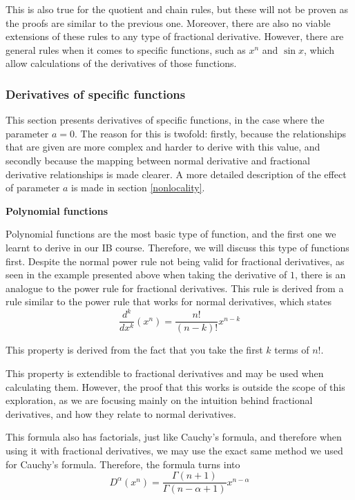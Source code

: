 \documentclass{article}
\begin{document}
This is also true for the quotient and chain rules, but these will not be
proven as the proofs are similar to the previous one. Moreover, there are also
no viable extensions of these rules to any type of fractional
derivative. However, there are general rules when it comes to specific
functions, such as $x^n$ and $\sin x$, which allow calculations of the
derivatives of those functions.

\subsubsection{Derivatives of specific functions} \label{der_examples}

This section presents derivatives of specific functions, in the case where the
parameter $a=0$. The reason for this is twofold: firstly, because the
relationships that are given are more complex and harder to derive with this
value, and secondly because the mapping between normal derivative and
fractional derivative relationships is made clearer. A more detailed
description of the effect of parameter $a$ is made in section
\ref{nonlocality}.

\textbf{Polynomial functions}

Polynomial functions are the most basic type of function, and the first one we
learnt to derive in our IB course. Therefore, we will discuss this type of
functions first. Despite the normal power rule not being valid for fractional
derivatives, as seen in the example presented above when taking the derivative
of $1$, there is an analogue to the power rule for fractional derivatives. This
rule is derived from a rule similar to the power rule that works for normal
derivatives, which states
$$
\frac{d^k}{dx^k} \left(x^n\right) = \frac{n!}{\left(n-k\right)!} x^{n-k}
$$
\parencite{ozaner2018}

This property is derived from the fact that you take the first $k$ terms of
$n!$.

This property is extendible to fractional derivatives and may be used when
calculating them. However, the proof that this works is outside the scope of
this exploration, as we are focusing mainly on the intuition behind fractional
derivatives, and how they relate to normal derivatives.

This formula also has factorials, just like Cauchy's formula, and therefore
when using it with fractional derivatives, we may use the exact same method we
used for Cauchy's formula. Therefore, the formula turns into
$$
D^\alpha \left(x^n\right) = \frac{\Gamma(n+1)}{\Gamma(n-\alpha + 1)} x^{n-\alpha}
$$
\end{document}
